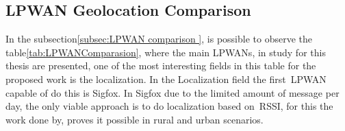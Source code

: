 
\newpage
\subsection{LPWAN Geolocation Comparison}
\label{sec:LPWNA_Geolocation_SOTA}


In the subsection\ref{subsec:LPWAN comparison }, is possible to observe the table\ref{tab:LPWANComparasion}, where the main LPWANs, in study for this thesis are presented, one of the most interesting fields in this table for the proposed work is the localization. In the Localization field the first~\gls{LPWAN} capable of do this is Sigfox. In Sigfox due to the limited amount of message per day, the only viable approach is to do localization based on~\gls{RSSI}, for this the work done by\cite{Aernouts2018RL2}, proves it possible in rural and urban scenarios.

